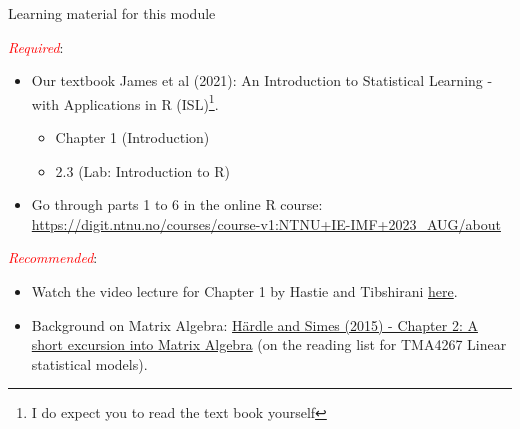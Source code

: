 \documentclass[
  10pt,
  ignorenonframetext,
]{beamer}
\providecommand{\tightlist}{%
  \setlength{\itemsep}{0pt}\setlength{\parskip}{0pt}}
\begin{document}
\begin{frame}
\begin{block}{Learning material for this module}
\protect\hypertarget{learning-material-for-this-module}{}
\(~\)

\emph{\textcolor{red}{Required}}:

\vspace{1mm}

\begin{itemize}
\tightlist
\item
  Our textbook James et al (2021): An Introduction to Statistical
  Learning - with Applications in R
  (ISL)\footnote{I do expect you to read the text book yourself}.

  \begin{itemize}
  \tightlist
  \item
    Chapter 1 (Introduction)
  \item
    2.3 (Lab: Introduction to R)
  \end{itemize}
\end{itemize}

\vspace{2mm}

\begin{itemize}
\tightlist
\item
  Go through parts 1 to 6 in the online R course:
  \url{https://digit.ntnu.no/courses/course-v1:NTNU+IE-IMF+2023_AUG/about}
\end{itemize}

\vspace{3mm}

\emph{\textcolor{red}{Recommended}}:

\vspace{1mm}

\begin{itemize}
\item
  Watch the video lecture for Chapter 1 by Hastie and Tibshirani
  \href{https://wiki.math.ntnu.no/tma4268/2024v/subpage1}{here}.
\item
  Background on Matrix Algebra:
  \href{https://link.springer.com/chapter/10.1007/978-3-662-45171-7_2}{Härdle
  and Simes (2015) - Chapter 2: A short excursion into Matrix Algebra}
  (on the reading list for TMA4267 Linear statistical models).
\end{itemize}
\end{block}
\end{frame}
\end{document}
